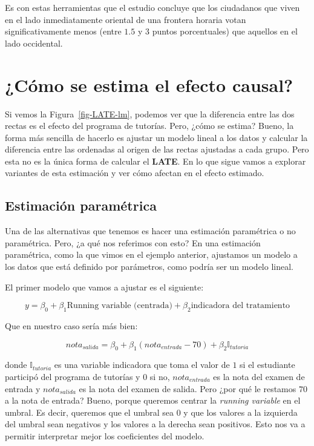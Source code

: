 \documentclass[
  letterpaper,
  DIV=11,
  numbers=noendperiod,
  oneside]{scrreprt}
\begin{document}
Es con estas herramientas que el estudio concluye que los ciudadanos que
viven en el lado inmediatamente oriental de una frontera horaria votan
significativamente menos (entre \(1.5\) y \(3\) puntos porcentuales) que
aquellos en el lado occidental.

\hypertarget{cuxf3mo-se-estima-el-efecto-causal}{%
\section{¿Cómo se estima el efecto
causal?}\label{cuxf3mo-se-estima-el-efecto-causal}}

Si vemos la Figura~\ref{fig-LATE-lm}, podemos ver que la diferencia
entre las dos rectas es el efecto del programa de tutorías. Pero, ¿cómo
se estima? Bueno, la forma más sencilla de hacerlo es ajustar un modelo
lineal a los datos y calcular la diferencia entre las ordenadas al
origen de las rectas ajustadas a cada grupo. Pero esta no es la única
forma de calcular el \textbf{LATE}. En lo que sigue vamos a explorar
variantes de esta estimación y ver cómo afectan en el efecto estimado.

\hypertarget{estimaciuxf3n-paramuxe9trica}{%
\subsection{Estimación paramétrica}\label{estimaciuxf3n-paramuxe9trica}}

Una de las alternativas que tenemos es hacer una estimación paramétrica
o no paramétrica. Pero, ¿a qué nos referimos con esto? En una estimación
paramétrica, como la que vimos en el ejemplo anterior, ajustamos un
modelo a los datos que está definido por parámetros, como podría ser un
modelo lineal.

El primer modelo que vamos a ajustar es el siguiente:

\[
y = \beta_0 + \beta_1 \text{Running variable (centrada)} + \beta_2 \text{indicadora del tratamiento}
\]

Que en nuestro caso sería más bien:

\[
nota_{salida} = \beta_0 + \beta_1 (nota_{entrada}-70) + \beta_2 \mathbb{I}_{tutoria}
\]

donde \(\mathbb{I}_{tutoria}\) es una variable indicadora que toma el
valor de \(1\) si el estudiante participó del programa de tutorías y
\(0\) si no, \(nota_{entrada}\) es la nota del examen de entrada y
\(nota_{salida}\) es la nota del examen de salida. Pero ¿por qué le
restamos \(70\) a la nota de entrada? Bueno, porque queremos centrar la
\emph{running variable} en el umbral. Es decir, queremos que el umbral
sea \(0\) y que los valores a la izquierda del umbral sean negativos y
los valores a la derecha sean positivos. Esto nos va a permitir
interpretar mejor los coeficientes del modelo.
\end{document}
